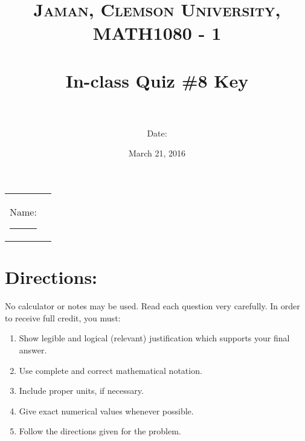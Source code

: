 \documentclass[paper=a4, fontsize=11pt]{scrartcl} %
\title{	
\normalfont \normalsize 
\textsc{Jaman, Clemson University, MATH1080 - 1} \\ [25pt] %
\horrule{0.5pt} \\[0.4cm] %
\huge In-class Quiz \#8 Key \\ %
\horrule{2pt} \\[0.5cm] %
}
\author{Date:} %
\date{\normalsize March 21, 2016} %
\numberwithin{equation}{section} %
\numberwithin{figure}{section} %
\numberwithin{table}{section} %
\begin{document}
\maketitle %

\begin{flushleft}
\begin{tabular}{l l}
Name: \rule{3.2in}{.01cm}  & {}%
\end{tabular}
\end{flushleft}


\section*{\textbf{Directions:}}

No calculator or notes may be used.  Read each question very carefully.  In order to receive full credit, you must:
\begin{enumerate}
\item Show legible and logical (relevant) justification which supports your final answer.
\item Use complete and correct mathematical notation.
\item Include proper units, if necessary.
\item Give exact numerical values whenever possible.
\item Follow the directions given for the problem.
\end{enumerate}
\vspace{.1in}

\newpage
\end{document}
